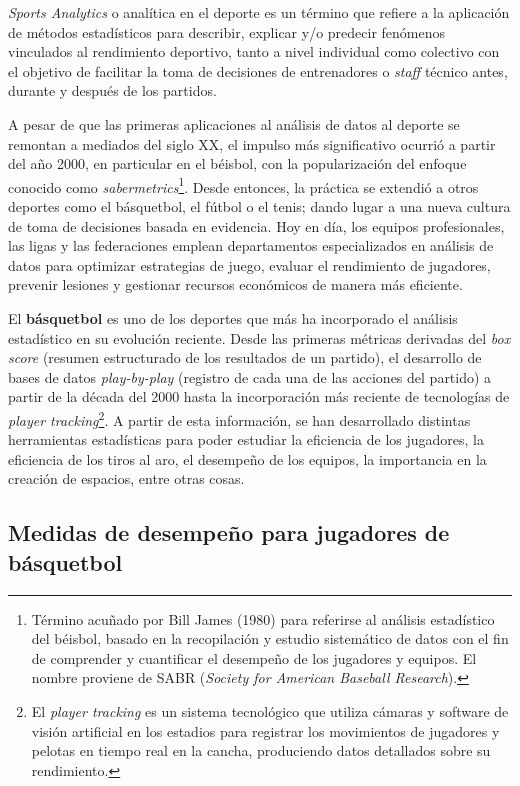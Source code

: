 \documentclass[
]{article}
\begin{document}
\emph{Sports Analytics} o analítica en el deporte es un término que
refiere a la aplicación de métodos estadísticos para describir, explicar
y/o predecir fenómenos vinculados al rendimiento deportivo, tanto a
nivel individual como colectivo con el objetivo de facilitar la toma de
decisiones de entrenadores o \emph{staff} técnico antes, durante y
después de los partidos.

A pesar de que las primeras aplicaciones al análisis de datos al deporte
se remontan a mediados del siglo XX, el impulso más significativo
ocurrió a partir del año 2000, en particular en el béisbol, con la
popularización del enfoque conocido como \emph{sabermetrics}\footnote{Término
  acuñado por Bill James (1980) para referirse al análisis estadístico
  del béisbol, basado en la recopilación y estudio sistemático de datos
  con el fin de comprender y cuantificar el desempeño de los jugadores y
  equipos. El nombre proviene de SABR (\emph{Society for American
  Baseball Research}).}. Desde entonces, la práctica se extendió a otros
deportes como el básquetbol, el fútbol o el tenis; dando lugar a una
nueva cultura de toma de decisiones basada en evidencia. Hoy en día, los
equipos profesionales, las ligas y las federaciones emplean
departamentos especializados en análisis de datos para optimizar
estrategias de juego, evaluar el rendimiento de jugadores, prevenir
lesiones y gestionar recursos económicos de manera más eficiente.

El \textbf{básquetbol} es uno de los deportes que más ha incorporado el
análisis estadístico en su evolución reciente. Desde las primeras
métricas derivadas del \emph{box score} (resumen estructurado de los
resultados de un partido), el desarrollo de bases de datos
\emph{play-by-play} (registro de cada una de las acciones del partido) a
partir de la década del 2000 hasta la incorporación más reciente de
tecnologías de \emph{player tracking}\footnote{El \emph{player tracking}
  es un sistema tecnológico que utiliza cámaras y software de visión
  artificial en los estadios para registrar los movimientos de jugadores
  y pelotas en tiempo real en la cancha, produciendo datos detallados
  sobre su rendimiento.}. A partir de esta información, se han
desarrollado distintas herramientas estadísticas para poder estudiar la
eficiencia de los jugadores, la eficiencia de los tiros al aro, el
desempeño de los equipos, la importancia en la creación de espacios,
entre otras cosas.

\subsection{Medidas de desempeño para jugadores de
básquetbol}\label{medidas-de-desempeuxf1o-para-jugadores-de-buxe1squetbol}
\end{document}
